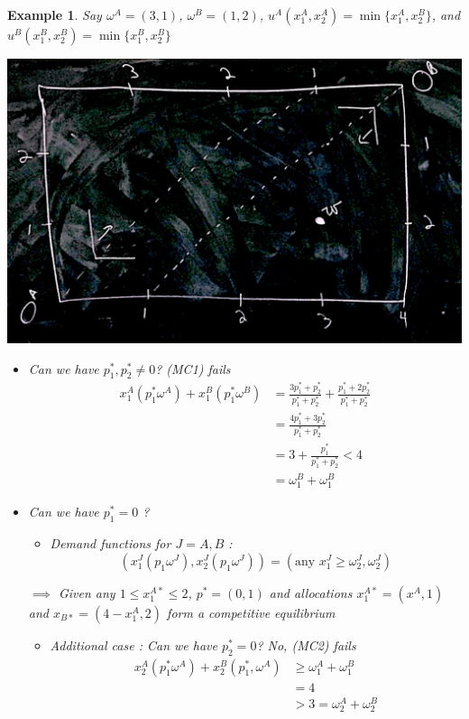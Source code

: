 \documentclass[twoside]{article}
\newtheorem{ex}[theorem]{Example}
\begin{document}
\begin{ex} Say \(\omega^A = (3, 1)\), \(\omega^B = (1, 2)\), \(u^A(x_1^A, x_2^A) = \min\{x_1^A, x_2^B\}\), and \(u^B (x_1^B, x_2^B) = \min \{x_1^B, x_2^B\} \)
\begin{center}
\includegraphics[scale=0.2]{17}
\end{center}
\begin{itemize}
\item Can we have \(p_1^*, p_2^* \neq 0\)? (MC1) fails 
\[\begin{aligned} x_1^A(p_1^*\omega^A) + x_1^B (p_1^* \omega^B) & = \frac{3p_1^* + p_2^*}{p_1^* + p_2^*} + \frac{p_1^* + 2p_2^*}{p_1^* + p_2^*} \\
 & = \frac{4p_1^* + 3p_2^*}{p_1^* + p_2^*} \\
 & = 3 + \frac{p_1^*}{p_1^* + p_2^* } < 4 \\
 & = \omega^B_1 + \omega^B_1
 \end{aligned}\]
\item Can we have \(p_1^* = 0\) ? 
\begin{itemize}
\item Demand functions for \(J = A, B\) : 
\[(x_1^J (p_1\omega^J), x_2^J(p_1 \omega^J)) = (\text{any } x_1^J \geq \omega^J_2 , \omega^J_2)\]
\end{itemize}
\(\implies\) Given any \(1 \leq x_1^{A*} \leq 2\), \(p^* = (0, 1) \) and allocations \(x_1^{A*} = (x^A, 1) \) and  \(x_{B*} = (4 - x^A_1 , 2) \) form a competitive equilibrium 
\begin{itemize}
\item Additional case : Can we have \(p_2^* =0 \)? No, (MC2) fails
\[\begin{aligned}x_2^A(p_1^*\omega^A) + x_2^B(p_1^*, \omega^A) & \geq \omega^A_1 + \omega_1^B \\ & = 4 \\ & > 3 = \omega_2^A + \omega^B_2 
\end{aligned}\]
\end{itemize}
\end{itemize}
\end{ex}
\end{document}

